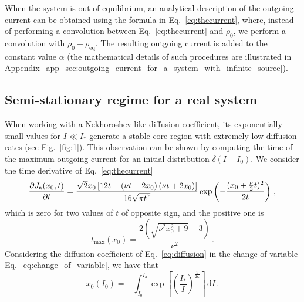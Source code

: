 {When the system is out of equilibrium, an analytical description of the outgoing current can be obtained using the formula in Eq.~\eqref{eq:thecurrent}, where, instead of performing a convolution between Eq.~\eqref{eq:thecurrent} and $\rho_0$, we perform a convolution with $\rho_0 - \rho_\text{eq}$. The resulting outgoing current is added to the constant value $\alpha$ (the mathematical details of such procedures are illustrated in Appendix~\ref{app_sec:outgoing_current_for_a_system_with_infinite_source}).


\subsection{Semi-stationary regime for a real system}
\label{subsec:semi_stationary_regime_for_a_real_system}


When working with a Nekhoroshev-like diffusion coefficient, its exponentially small values for $I \ll I_\ast$ generate a stable-core region with extremely low diffusion rates (see Fig.~\ref{fig:1}). This observation can be shown by computing the time of the maximum outgoing current for an initial distribution $\delta(I - I_0)$. We consider the time derivative of Eq.~\eqref{eq:thecurrent}
\begin{equation}
\pdv{J_\mathrm{a}(x_0, t)}{t} = \frac{\sqrt{2} x_0 \left[12 t + \left(\nu t - 2 x_0\right) \left(\nu t + 2 x_0\right)\right] }{16 \sqrt{\pi t^7}}\exp\left(-\frac{(x_0+\frac{\nu}{2}t)^2}{2t}\right)\,,
\end{equation}
which is zero for two values of $t$ of opposite sign, and the positive one is
\begin{equation}
    t_{\text{max}}(x_0) = \frac{2 \left(\sqrt{\nu^{2} x_0^{2} + 9} - 3\right)}{\nu^{2}}\,.
    \label{eq:taumax}
\end{equation}
Considering the diffusion coefficient of Eq.~\eqref{eq:diffusion} in the change of variable Eq.~\eqref{eq:change_of_variable}, we have that
\begin{equation}
    x_0(I_0) = {-}\int_{I_0}^{I_\mathrm{a}} \exp\left[\left(\frac{I_\ast}{I}\right)^{\frac{1}{2\kappa}}\right]\,\mathrm{d}I\,.
    \label{eq:peak_current_time}
\end{equation}

}
